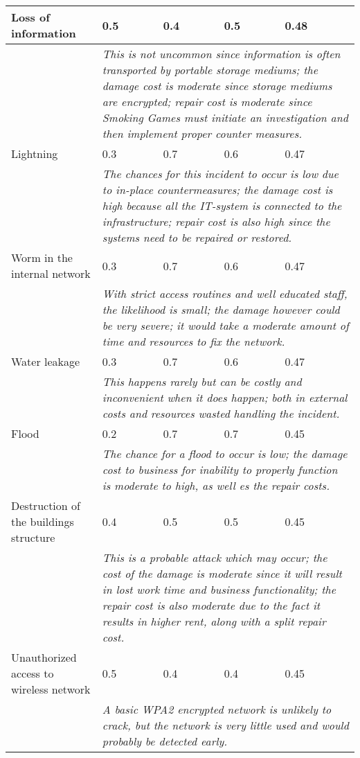 \begin{longtable}{| p{4.2cm} | p{1.8cm} | p{1.8cm} | p{1.8cm} | p{1.8cm} |}
		Loss of information & 0.5 & 0.4 & 0.5 & 0.48\\\hline
		& \multicolumn{4}{|p{8cm}|}{\textit{This is not uncommon since information is often transported by portable storage mediums; the damage cost is moderate since storage mediums are encrypted; repair cost is moderate since Smoking Games must initiate an investigation and then implement proper counter measures.}}\\\hline
		Lightning & 0.3 & 0.7 & 0.6 & 0.47\\\hline
		& \multicolumn{4}{|p{8cm}|}{\textit{The chances for this incident to occur is low due to in-place countermeasures; the damage cost is high because all the IT-system is connected to the infrastructure; repair cost is also high since the systems need to be repaired or restored.}}\\\hline
		Worm in the internal network & 0.3 & 0.7 & 0.6 & 0.47\\\hline
		& \multicolumn{4}{|p{8cm}|}{\textit{With strict access routines and well educated staff, the likelihood is small; the damage however could be very severe; it would take a moderate amount of time and resources to fix the network.}}\\\hline
		Water leakage & 0.3 & 0.7 & 0.6 & 0.47\\\hline
		& \multicolumn{4}{|p{8cm}|}{\textit{This happens rarely but can be costly and inconvenient when it does happen; both in external costs and resources wasted handling the incident.}}\\\hline
		Flood & 0.2 & 0.7 & 0.7 & 0.45\\\hline
		& \multicolumn{4}{|p{8cm}|}{\textit{The chance for a flood to occur is low; the damage cost to business for inability to properly function is moderate to high, as well es the repair costs.}}\\\hline
		Destruction of the buildings structure & 0.4 & 0.5 & 0.5 & 0.45\\\hline
		& \multicolumn{4}{|p{8cm}|}{\textit{This is a probable attack which may occur; the cost of the damage is moderate since it will result in lost work time and business functionality; the repair cost is also moderate due to the fact it results in higher rent, along with a split repair cost.}}\\\hline
		Unauthorized access to wireless network & 0.5 & 0.4 & 0.4 & 0.45\\\hline
		& \multicolumn{4}{|p{8cm}|}{\textit{A basic WPA2 encrypted network is unlikely to crack, but the network is very little used and would probably be detected early.}}\\\hline

\end{longtable}
